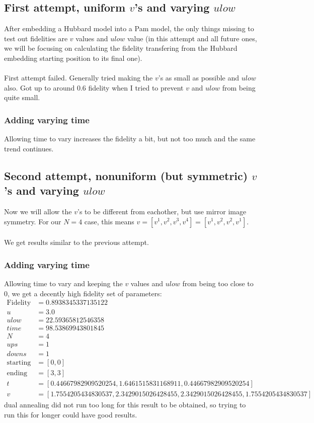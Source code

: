 \subsection{First attempt, uniform $v$'s and varying $ulow$}
After embedding a Hubbard model into a Pam model, the only things missing to test out fidelities are $v$ values and $ulow$ value (in this attempt and all future ones, we will be focusing on calculating the fidelity transfering from the Hubbard embedding starting position to its final one). \\
\\
First attempt failed.
Generally tried making the $v$'s as small as possible and $ulow$ also.
Got up to around $0.6$ fidelity when I tried to prevent $v$ and $ulow$ from being quite small.
\subsubsection{Adding varying time}
Allowing time to vary increases the fidelity a bit, but not too much and the same trend continues.
\subsection{Second attempt, nonuniform (but symmetric) $v$'s and varying $ulow$}
Now we will allow the $v$'s to be different from eachother, but use mirror image symmetry.
For our $N=4$ case, this means $v=[v^1,v^2,v^3,v^4]=[v^1,v^2,v^2,v^1]$. \\
\\
We get results similar to the previous attempt.
\subsubsection{Adding varying time}
Allowing time to vary and keeping the $v$ values and $ulow$ from being too close to $0$, we get a decently high fidelity set of parameters:
\begin{align*}
    \text{Fidelity} &= 0.8938345337135122 \\
    u &= 3.0 \\
    ulow &= 22.59365812546358 \\
    time &= 98.53869943801845 \\
    N &= 4 \\
    ups &= 1 \\
    downs &= 1 \\
    \text{starting} &= [0,0]\\
    \text{ending} &=  [3,3] \\
    t &= [0.44667982909520254,1.6461515831168911,0.44667982909520254] \\
    v &= [1.7554205434830537,2.3429015026428455,2.3429015026428455,1.7554205434830537]
\end{align*}
dual annealing did not run too long for this result to be obtained, so trying to run this for longer could have good results.
